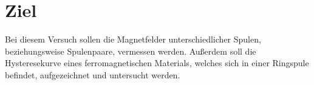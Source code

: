 \section{Ziel}
\label{sec:Ziel}
Bei diesem Versuch sollen die Magnetfelder unterschiedlicher Spulen, beziehungsweise Spulenpaare, 
vermessen werden. Außerdem soll die Hysteresekurve eines ferromagnetischen Materials, welches sich in einer
Ringspule befindet, aufgezeichnet und untersucht werden.



